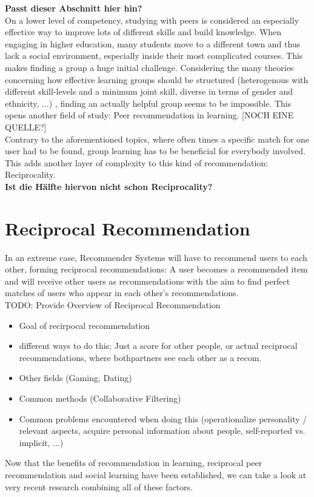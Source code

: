 \documentclass[nochapterpage,bigchapter,linedtoc,longdoc,colorback,accentcolor=tud3b]{tudreport}
\begin{document}
\textbf{Passt dieser Abschnitt hier hin?}\\
On a lower level of competency, studying with peers is considered an especially effective way to improve lots of different skills and build knowledge. \cite{maxwell2008learning} When engaging in higher education, many students move to a different town and thus lack a social environment, especially inside their most complicated courses. This makes finding a group a huge initial challenge. Considering the many theories concerning how effective learning groups should be structured (heterogenous with different skill-levels and a minimum joint skill, diverse in terms of gender and ethnicity, ...) \cite{manske2015using, blumenfeld1996learning}, finding an actually helpful group seems to be impossible. This opens another field of study: Peer recommendation in learning. \cite{potts2018reciprocal, olakanmi2017group} [NOCH EINE QUELLE?]\\
Contrary to the aforementioned topics, where often times a specific match for one user had to be found, group learning has to be beneficial for everybody involved. This adds another layer of complexity to this kind of recommendation: Reciprocality.\\
\textbf{Ist die Hälfte hiervon nicht schon Reciprocality?}

\section{Reciprocal Recommendation}
In an extreme case, Recommender Systems will have to recommend users to each other, forming reciprocal recommendations: A user becomes a recommended item and will receive other users as recommendations with the aim to find perfect matches of users who appear in each other's recommendations.\\
TODO: Provide Overview of Reciprocal Recommendation\\
\begin{itemize}
	\item Goal of recirpocal recommendation
	\item different ways to do this: Just a score for other people, or actual reciprocal recommendations, where bothpartners see each other as a recom.
	\item Other fields (Gaming, Dating)
	\item Common methods (Collaborative Filtering)
	\item Common problems encountered when doing this (operationalize personality / relevant aspects, acquire personal information about people, self-reported vs. implicit, ...)
\end{itemize}
Now that the benefits of recommendation in learning, reciprocal peer recommendation and social learning have been established, we can take a look at very recent research combining all of these factors.\\
\end{document}

